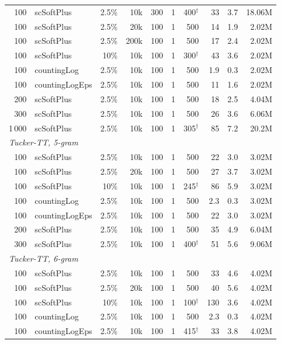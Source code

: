 \begin{table}[t]
\begin{tabular}{rlrrrrrrrr}
    100 & scSoftPlus & 2.5\% & 10k & 300 & 1 & 400$^\dagger$ & 33 & 3.7 & 18.06M \\
    100 & scSoftPlus & 2.5\% & 20k & 100 & 1 & 500 & 14 & 1.9 & 2.02M \\
    100 & scSoftPlus & 2.5\% & 200k & 100 & 1 & 500 & 17 & 2.4 & 2.02M \\
    100 & scSoftPlus & 10\% & 10k & 100 & 1 & 300$^\dagger$ & 43 & 3.6 & 2.02M \\
    100 & countingLog & 2.5\% & 10k & 100 & 1 & 500 & 1.9 & 0.3 & 2.02M \\
    100 & countingLogEps & 2.5\% & 10k & 100 & 1 & 500 & 11 & 1.6 & 2.02M \\
    200 & scSoftPlus & 2.5\% & 10k & 100 & 1 & 500 & 18 & 2.5 & 4.04M \\
    300 & scSoftPlus & 2.5\% & 10k & 100 & 1 & 500 & 26 & 3.6 & 6.06M \\
    1\,000 & scSoftPlus & 2.5\% & 10k & 100 & 1 & 305$^\dagger$ & 85 & 7.2 & 20.2M \\
    \midrule
    \multicolumn{10}{l}{\textit{Tucker-TT, 5-gram}} \\
    100 & scSoftPlus & 2.5\% & 10k & 100 & 1 & 500 & 22 & 3.0 & 3.02M \\
    100 & scSoftPlus & 2.5\% & 20k & 100 & 1 & 500 & 27 & 3.7 & 3.02M \\
    100 & scSoftPlus & 10\% & 10k & 100 & 1 & 245$^\dagger$ & 86 & 5.9 & 3.02M \\
    100 & countingLog & 2.5\% & 10k & 100 & 1 & 500 & 2.3 & 0.3 & 3.02M \\
    100 & countingLogEps & 2.5\% & 10k & 100 & 1 & 500 & 22 & 3.0 & 3.02M \\
    200 & scSoftPlus & 2.5\% & 10k & 100 & 1 & 500 & 35 & 4.9 & 6.04M \\
    300 & scSoftPlus & 2.5\% & 10k & 100 & 1 & 400$^\dagger$ & 51 & 5.6 & 9.06M \\
    \midrule
    \multicolumn{10}{l}{\textit{Tucker-TT, 6-gram}} \\
    100 & scSoftPlus & 2.5\% & 10k & 100 & 1 & 500 & 33 & 4.6 & 4.02M \\
    100 & scSoftPlus & 2.5\% & 20k & 100 & 1 & 500 & 40 & 5.6 & 4.02M \\
    100 & scSoftPlus & 10\% & 10k & 100 & 1 & 100$^\dagger$ & 130 & 3.6 & 4.02M \\
    100 & countingLog & 2.5\% & 10k & 100 & 1 & 500 & 2.3 & 0.3 & 4.02M \\
    100 & countingLogEps & 2.5\% & 10k & 100 & 1 & 415$^\dagger$ & 33 & 3.8 & 4.02M \\

\end{tabular}
\end{table}
